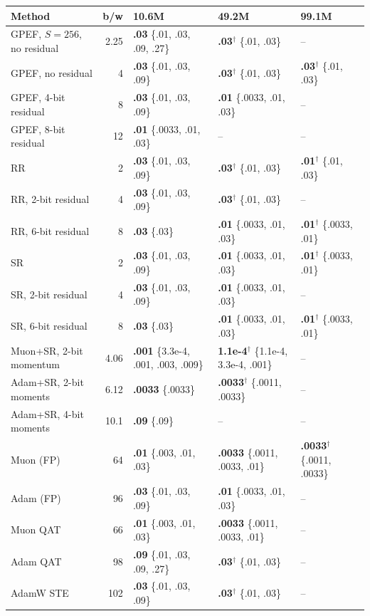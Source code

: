 \begin{tabular}{lrlll}
\toprule
Method & b/w & 10.6M & 49.2M & 99.1M \\
\midrule
GPEF, $S{=}256$, no residual & 2.25 & \textbf{.03} \{.01, .03, .09, .27\} & \textbf{.03}$^\dagger$ \{.01, .03\} & -- \\
GPEF, no residual & 4 & \textbf{.03} \{.01, .03, .09\} & \textbf{.03}$^\dagger$ \{.01, .03\} & \textbf{.03}$^\dagger$ \{.01, .03\} \\
GPEF, 4-bit residual & 8 & \textbf{.03} \{.01, .03, .09\} & \textbf{.01} \{.0033, .01, .03\} & -- \\
GPEF, 8-bit residual & 12 & \textbf{.01} \{.0033, .01, .03\} & -- & -- \\
RR & 2 & \textbf{.03} \{.01, .03, .09\} & \textbf{.03}$^\dagger$ \{.01, .03\} & \textbf{.01}$^\dagger$ \{.01, .03\} \\
RR, 2-bit residual & 4 & \textbf{.03} \{.01, .03, .09\} & \textbf{.03}$^\dagger$ \{.01, .03\} & -- \\
RR, 6-bit residual & 8 & \textbf{.03} \{.03\} & \textbf{.01} \{.0033, .01, .03\} & \textbf{.01}$^\dagger$ \{.0033, .01\} \\
SR & 2 & \textbf{.03} \{.01, .03, .09\} & \textbf{.01} \{.0033, .01, .03\} & \textbf{.01}$^\dagger$ \{.0033, .01\} \\
SR, 2-bit residual & 4 & \textbf{.03} \{.01, .03, .09\} & \textbf{.01} \{.0033, .01, .03\} & -- \\
SR, 6-bit residual & 8 & \textbf{.03} \{.03\} & \textbf{.01} \{.0033, .01, .03\} & \textbf{.01}$^\dagger$ \{.0033, .01\} \\
Muon+SR, 2-bit momentum & 4.06 & \textbf{.001} \{3.3e-4, .001, .003, .009\} & \textbf{1.1e-4}$^\dagger$ \{1.1e-4, 3.3e-4, .001\} & -- \\
Adam+SR, 2-bit moments & 6.12 & \textbf{.0033} \{.0033\} & \textbf{.0033}$^\dagger$ \{.0011, .0033\} & -- \\
Adam+SR, 4-bit moments & 10.1 & \textbf{.09} \{.09\} & -- & -- \\
Muon (FP) & 64 & \textbf{.01} \{.003, .01, .03\} & \textbf{.0033} \{.0011, .0033, .01\} & \textbf{.0033}$^\dagger$ \{.0011, .0033\} \\
Adam (FP) & 96 & \textbf{.03} \{.01, .03, .09\} & \textbf{.01} \{.0033, .01, .03\} & -- \\
Muon QAT & 66 & \textbf{.01} \{.003, .01, .03\} & \textbf{.0033} \{.0011, .0033, .01\} & -- \\
Adam QAT & 98 & \textbf{.09} \{.01, .03, .09, .27\} & \textbf{.03}$^\dagger$ \{.01, .03\} & -- \\
AdamW STE & 102 & \textbf{.03} \{.01, .03, .09\} & \textbf{.03}$^\dagger$ \{.01, .03\} & -- \\
\bottomrule
\end{tabular}
